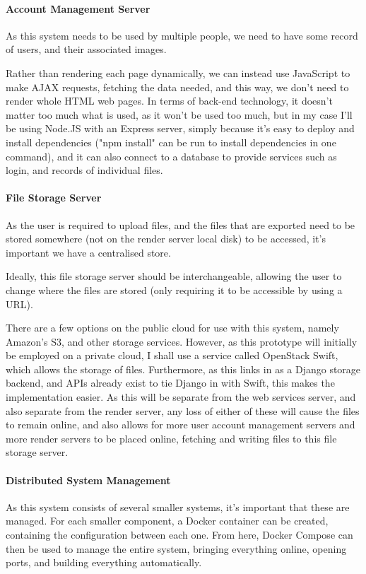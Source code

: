 \documentclass[12pt,a4paper]{article}
\begin{document}
\paragraph{Account Management Server}
As this system needs to be used by multiple people, we need to have some record of users,
and their associated images.

Rather than rendering each page dynamically, we can instead use JavaScript to make AJAX requests,
fetching the data needed, and this way, we don't need to render whole HTML web pages. In terms of
back-end technology, it doesn't matter too much what is used, as it won't be used too much, but
in my case I'll be using Node.JS with an Express server, simply because it's easy to deploy and
install dependencies ("npm install" can be run to install dependencies in one command), and it can
also connect to a database to provide services such as login, and records of individual files.

\paragraph{File Storage Server}
As the user is required to upload files, and the files that are exported need to be stored
somewhere (not on the render server local disk) to be accessed, it's important we have a
centralised store.

Ideally, this file storage server should be interchangeable, allowing the user to change
where the files are stored (only requiring it to be accessible by using a URL).

There are a few options on the public cloud for use with this system, namely Amazon's S3,
and other storage services. However, as this prototype will initially be employed on a
private cloud, I shall use a service called OpenStack Swift, which allows the storage of files.
Furthermore, as this links in as a Django storage backend, and APIs already exist to tie Django in
with Swift, this makes the implementation easier. As this will be separate from the web services server,
and also separate from the render server, any loss of either of these will cause the files to remain online,
and also allows for more user account management servers and more render servers to be placed online,
fetching and writing files to this file storage server.


\paragraph{Distributed System Management}
As this system consists of several smaller systems, it's important that these are
managed. For each smaller component, a Docker container can be created, containing the
configuration between each one. From here, Docker Compose can then be used to manage
the entire system, bringing everything online, opening ports, and building everything
automatically.
\end{document}
